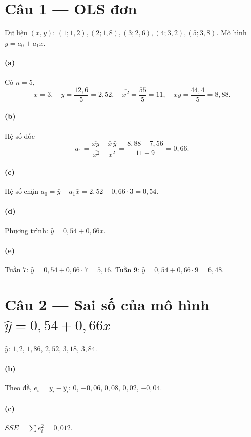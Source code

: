 \section*{Câu 1 --- OLS đơn}
Dữ liệu $(x,y)$: $(1;1{,}2),(2;1{,}8),(3;2{,}6),(4;3{,}2),(5;3{,}8)$. Mô hình $y=a_0+a_1x$.

\paragraph{(a)} Có $n=5$,
\[
\bar x=3,\quad \bar y=\frac{12{,}6}{5}=2{,}52,\quad \overline{x^2}=\frac{55}{5}=11,\quad \overline{xy}=\frac{44{,}4}{5}=8{,}88.
\]

\paragraph{(b)} Hệ số dốc
\[
a_1=\frac{\overline{xy}-\bar x\,\bar y}{\overline{x^2}-\bar x^2}
=\frac{8{,}88-7{,}56}{11-9}=0{,}66.
\]

\paragraph{(c)} Hệ số chặn $a_0=\bar y-a_1\bar x=2{,}52-0{,}66\cdot 3=0{,}54$.

\paragraph{(d)} Phương trình: $\hat y=0{,}54+0{,}66x$.

\paragraph{(e)} Tuần $7$: $\hat y=0{,}54+0{,}66\cdot 7=5{,}16$.
Tuần $9$: $\hat y=0{,}54+0{,}66\cdot 9=6{,}48$.

\section*{Câu 2 --- Sai số của mô hình $\hat y=0{,}54+0{,}66x$}
$\hat y$: $1{,}2$, $1{,}86$, $2{,}52$, $3{,}18$, $3{,}84$.

\paragraph{(b)} Theo đề, $e_i=y_i-\hat y_i$: $0$, $-0{,}06$, $0{,}08$, $0{,}02$, $-0{,}04$.

\paragraph{(c)} $SSE=\sum e_i^2=0{,}012$.

